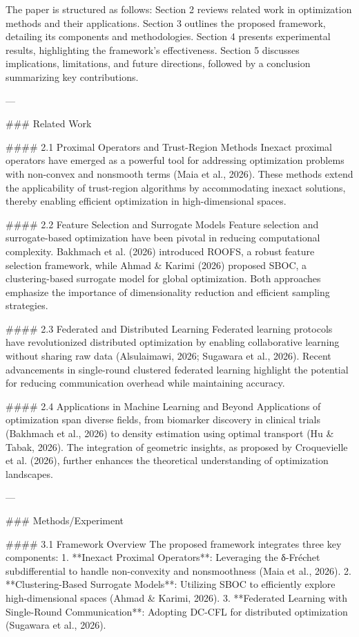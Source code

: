The paper is structured as follows: Section 2 reviews related work in optimization methods and their applications. Section 3 outlines the proposed framework, detailing its components and methodologies. Section 4 presents experimental results, highlighting the framework's effectiveness. Section 5 discusses implications, limitations, and future directions, followed by a conclusion summarizing key contributions.

---

### Related Work

#### 2.1 Proximal Operators and Trust-Region Methods
Inexact proximal operators have emerged as a powerful tool for addressing optimization problems with non-convex and nonsmooth terms (Maia et al., 2026). These methods extend the applicability of trust-region algorithms by accommodating inexact solutions, thereby enabling efficient optimization in high-dimensional spaces.

#### 2.2 Feature Selection and Surrogate Models
Feature selection and surrogate-based optimization have been pivotal in reducing computational complexity. Bakhmach et al. (2026) introduced ROOFS, a robust feature selection framework, while Ahmad & Karimi (2026) proposed SBOC, a clustering-based surrogate model for global optimization. Both approaches emphasize the importance of dimensionality reduction and efficient sampling strategies.

#### 2.3 Federated and Distributed Learning
Federated learning protocols have revolutionized distributed optimization by enabling collaborative learning without sharing raw data (Alsulaimawi, 2026; Sugawara et al., 2026). Recent advancements in single-round clustered federated learning highlight the potential for reducing communication overhead while maintaining accuracy.

#### 2.4 Applications in Machine Learning and Beyond
Applications of optimization span diverse fields, from biomarker discovery in clinical trials (Bakhmach et al., 2026) to density estimation using optimal transport (Hu & Tabak, 2026). The integration of geometric insights, as proposed by Croquevielle et al. (2026), further enhances the theoretical understanding of optimization landscapes.

---

### Methods/Experiment

#### 3.1 Framework Overview
The proposed framework integrates three key components:
1. **Inexact Proximal Operators**: Leveraging the δ-Fréchet subdifferential to handle non-convexity and nonsmoothness (Maia et al., 2026).
2. **Clustering-Based Surrogate Models**: Utilizing SBOC to efficiently explore high-dimensional spaces (Ahmad & Karimi, 2026).
3. **Federated Learning with Single-Round Communication**: Adopting DC-CFL for distributed optimization (Sugawara et al., 2026).

